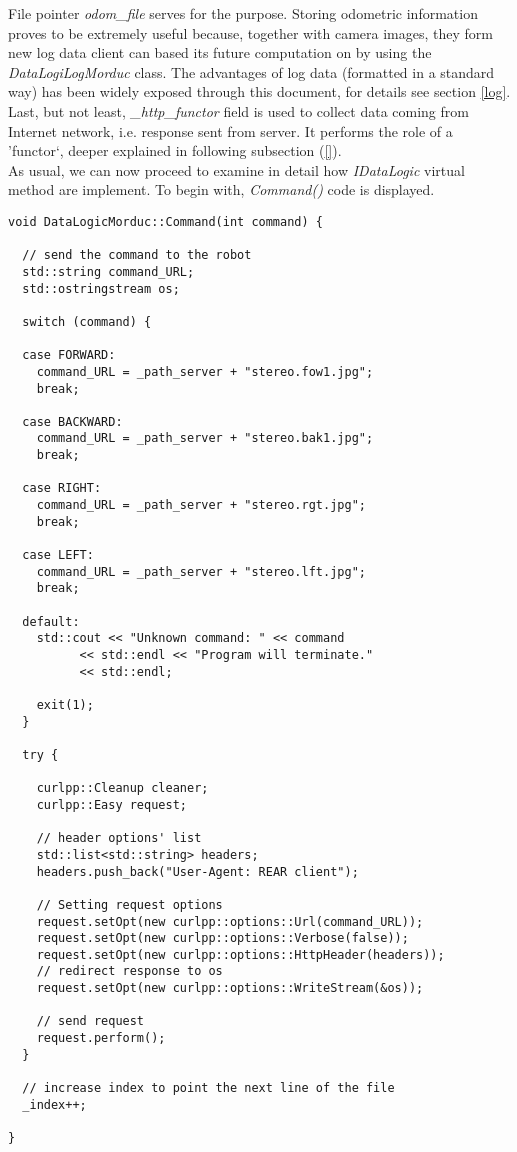 File pointer \textit{odom\_file} serves for the purpose. Storing
odometric information proves to be extremely useful because,
together with camera images, they form new log data client can
based its future computation on by using the \textit{DataLogiLogMorduc}
class. The advantages of log data (formatted in a standard way)
has been widely exposed through
this document, for details see section \ref{log}.
\\
Last, but not least, \textit{\_http\_functor} field is used to
collect data coming from Internet network, i.e. response sent from
server. It performs the role of a 'functor`, deeper explained in
following subsection (\ref{}).
\\
As usual, we can now proceed to examine in detail how \textit{IDataLogic}
virtual method are implement. To begin with, \textit{Command()} code is
displayed.
\\
\begin{lstlisting}[caption={\texttt{DataLogicMorduc::Command() method}},
    label={code:datalogicmorduc:command}]
void DataLogicMorduc::Command(int command) {

  // send the command to the robot
  std::string command_URL;
  std::ostringstream os;

  switch (command) {

  case FORWARD:
    command_URL = _path_server + "stereo.fow1.jpg";
    break;

  case BACKWARD:
    command_URL = _path_server + "stereo.bak1.jpg";
    break;

  case RIGHT:
    command_URL = _path_server + "stereo.rgt.jpg";
    break;

  case LEFT:
    command_URL = _path_server + "stereo.lft.jpg";
    break;

  default:
    std::cout << "Unknown command: " << command
	      << std::endl << "Program will terminate."
	      << std::endl;

    exit(1);
  }
 
  try {

    curlpp::Cleanup cleaner;
    curlpp::Easy request;

    // header options' list
    std::list<std::string> headers;
    headers.push_back("User-Agent: REAR client"); 

    // Setting request options
    request.setOpt(new curlpp::options::Url(command_URL));
    request.setOpt(new curlpp::options::Verbose(false));
    request.setOpt(new curlpp::options::HttpHeader(headers));
    // redirect response to os
    request.setOpt(new curlpp::options::WriteStream(&os));    
    
    // send request
    request.perform();    
  }
       
  // increase index to point the next line of the file
  _index++;

}
\end{lstlisting}

